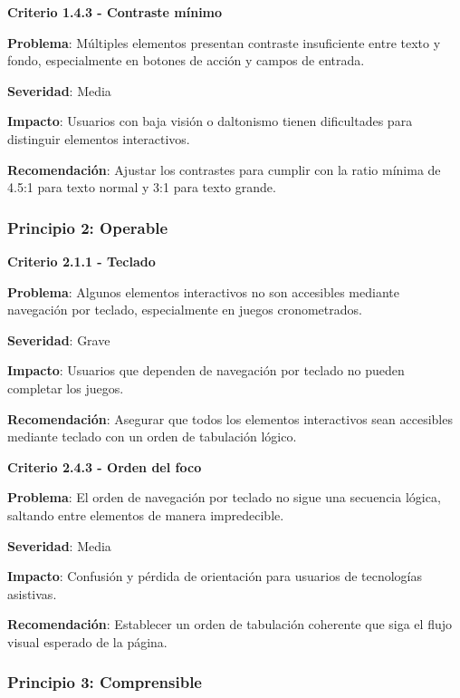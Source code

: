 \documentclass{article}
\begin{document}
	\vspace{0.5cm}
	
	\noindent
	\textbf{Criterio 1.4.3 - Contraste mínimo}
	
	\noindent
	\textbf{Problema}: Múltiples elementos presentan contraste insuficiente entre texto y fondo, especialmente en botones de acción y campos de entrada.
	
	\noindent
	\textbf{Severidad}: Media
	
	\noindent
	\textbf{Impacto}: Usuarios con baja visión o daltonismo tienen dificultades para distinguir elementos interactivos.
	
	\noindent
	\textbf{Recomendación}: Ajustar los contrastes para cumplir con la ratio mínima de 4.5:1 para texto normal y 3:1 para texto grande.

	\subsubsection{Principio 2: Operable}
	
	\noindent
	\textbf{Criterio 2.1.1 - Teclado}
	
	\noindent
	\textbf{Problema}: Algunos elementos interactivos no son accesibles mediante navegación por teclado, especialmente en juegos cronometrados.
	
	\noindent
	\textbf{Severidad}: Grave
	
	\noindent
	\textbf{Impacto}: Usuarios que dependen de navegación por teclado no pueden completar los juegos.
	
	\noindent
	\textbf{Recomendación}: Asegurar que todos los elementos interactivos sean accesibles mediante teclado con un orden de tabulación lógico.
	
	\vspace{0.5cm}
	
	\noindent
	\textbf{Criterio 2.4.3 - Orden del foco}
	
	\noindent
	\textbf{Problema}: El orden de navegación por teclado no sigue una secuencia lógica, saltando entre elementos de manera impredecible.
	
	\noindent
	\textbf{Severidad}: Media
	
	\noindent
	\textbf{Impacto}: Confusión y pérdida de orientación para usuarios de tecnologías asistivas.
	
	\noindent
	\textbf{Recomendación}: Establecer un orden de tabulación coherente que siga el flujo visual esperado de la página.

	\subsubsection{Principio 3: Comprensible}
	
\end{document}
